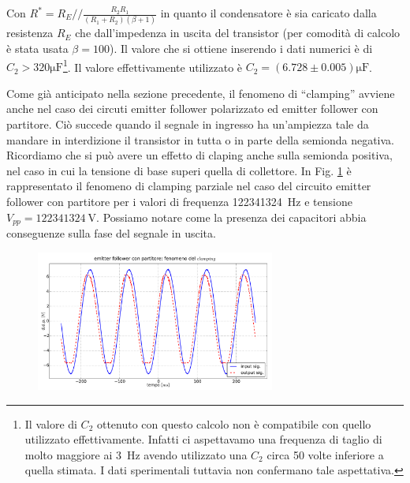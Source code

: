 Con $R^*=R_E//\frac{R_2R_1}{(R_1+R_2)(\beta +1)}$ in quanto il condensatore è sia caricato dalla resistenza $R_E$ che dall'impedenza in uscita del transistor (per comodità di calcolo è stata usata $\beta=100$). Il valore che si ottiene inserendo i dati numerici è di $C_2>320\si{\micro\farad}$\footnote{Il valore di $C_2$ ottenuto con questo calcolo non è compatibile con quello utilizzato effettivamente. Infatti ci aspettavamo una frequenza di taglio di molto maggiore ai \SI{3}{\hertz} avendo utilizzato una $C_2$ circa 50 volte inferiore a quella stimata. I dati sperimentali tuttavia non confermano tale aspettativa.}. Il valore effettivamente utilizzato è $C_2=(6.728 \pm 0.005)\si{\micro\farad}$. 


Come già anticipato nella sezione precedente, il fenomeno di ``clamping'' avviene anche nel caso dei circuti emitter follower polarizzato ed emitter follower con partitore.
Ciò succede quando il segnale in ingresso ha un'ampiezza tale da mandare in interdizione il transistor in tutta o in parte  della semionda negativa. Ricordiamo che si può avere un effetto di claping anche sulla semionda positiva, nel caso in cui la tensione di base superi quella di collettore. 
In Fig. \ref{fig:clamp} è rappresentato il fenomeno di clamping parziale nel caso del circuito emitter follower con partitore per i valori di frequenza \SI{122341324}{\hertz} e tensione $V_{pp} = \SI{122341324}{\volt}$. Possiamo notare come la presenza dei capacitori abbia conseguenze sulla fase del segnale in uscita.


\begin{figure}[h]
\centering
	\includegraphics[width=0.7\textwidth]{clamp.pdf}
	\caption{}
	\label{fig:clamp}
\end{figure}